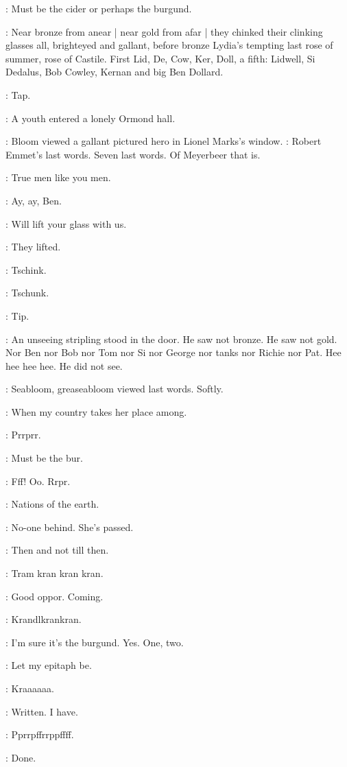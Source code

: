\BloomInt:
Must be the cider or perhaps the burgund.

:
Near bronze from anear |
near gold from afar |
they chinked their clinking glasses all,
brighteyed and gallant,
before bronze Lydia's tempting
last rose of summer,
rose of Castile.
First Lid,
De,
Cow,
Ker,
Doll,
a fifth:
Lidwell,
Si Dedalus,
Bob Cowley,
Kernan and big Ben Dollard.

\stripling:
Tap.

:
A youth entered a lonely Ormond hall.

:
Bloom viewed a gallant pictured hero in Lionel Marks's window.
\BloomInt:
Robert Emmet's last words.
Seven last words.
Of Meyerbeer that is.

\dollard:
True men like you men.

\simon:
Ay,
ay,
Ben.

\dollard:
Will lift your glass with us.

:
They lifted.


:
Tschink.

:
Tschunk.

\stripling:
Tip.

:
An unseeing stripling stood in the door.
He saw not bronze.
He
saw not gold.
Nor Ben nor Bob nor Tom nor Si nor George nor tanks nor
Richie nor Pat.
Hee hee hee hee.
He did not see.

:
Seabloom,
greaseabloom viewed last words.
Softly.

\emmet:
When my country takes her place among.

:
Prrprr.

\BloomInt:
Must be the bur.

:
Fff!
Oo.
Rrpr.

\emmet:
Nations of the earth.

\BloomInt:
No-one behind.
She's passed.

\emmet:
Then and not till then.

:
Tram kran kran kran.

\BloomInt:
Good oppor.
Coming.

:
Krandlkrankran.

\BloomInt:
I'm sure it's the burgund.
Yes.
One,
two.

\emmet:
Let my epitaph be.

:
Kraaaaaa.

\emmet:
Written.
I have.

:
Pprrpffrrppffff.

\emmet:
Done.
